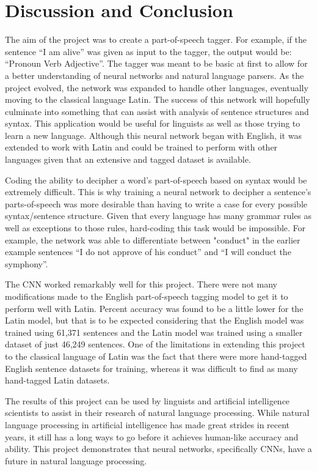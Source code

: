 \documentclass[conference]{IEEEtran}
\begin{document}
\section{Discussion and Conclusion}
    The aim of the project was to create a part-of-speech tagger. For example, if the sentence “I am alive” was given as input to the tagger, the output would be: “Pronoun Verb Adjective”. The tagger was meant to be basic at first to allow for a better understanding of neural networks and natural language parsers. As the project evolved, the network was expanded to handle other languages, eventually moving to the classical language Latin. The success of this network will hopefully culminate into something that can assist with analysis of sentence structures and syntax. This application would be useful for linguists as well as those trying to learn a new language. Although this neural network began with English, it was extended to work with Latin and could be trained to perform with other languages given that an extensive and tagged dataset is available.
    
    Coding the ability to decipher a word’s part-of-speech based on syntax would be extremely difficult. This is why training a neural network to decipher a sentence's parts-of-speech was more desirable than having to write a case for every possible syntax/sentence structure. Given that every language has many grammar rules as well as exceptions to those rules, hard-coding this task would be impossible. For example, the network was able to differentiate between "conduct" in the earlier example sentences “I do not approve of his conduct” and “I will conduct the symphony”.
    
    The CNN worked remarkably well for this project. There were not many modifications made to the English part-of-speech tagging model to get it to perform well with Latin. Percent accuracy was found to be a little lower for the Latin model, but that is to be expected considering that the English model was trained using 61,371 sentences and the Latin model was trained using a smaller dataset of just 46,249 sentences. One of the limitations in extending this project to the classical language of Latin was the fact that there were more hand-tagged English sentence datasets for training, whereas it was difficult  to find as many hand-tagged Latin datasets. 
    
    The results of this project can be used by linguists and artificial intelligence scientists to assist in their research of natural language processing. While natural language processing in artificial intelligence has made great strides in recent years, it still has a long ways to go before it achieves human-like accuracy and ability. This project demonstrates that neural networks, specifically CNNs, have a future in natural language processing.




\end{document}
